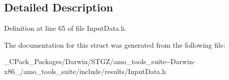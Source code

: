 \subsection{Detailed Description}


Definition at line 65 of file Input\+Data.\+h.



The documentation for this struct was generated from the following file\+:\begin{DoxyCompactItemize}
\item 
\+\_\+\+C\+Pack\+\_\+\+Packages/\+Darwin/\+S\+T\+G\+Z/amo\+\_\+tools\+\_\+suite-\/-\/\+Darwin-\/x86\+\_/amo\+\_\+tools\+\_\+suite/include/results/Input\+Data.\+h\end{DoxyCompactItemize}
